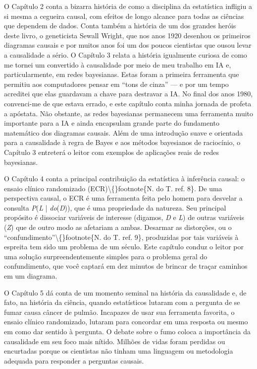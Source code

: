 \documentclass[11pt,a5paper,twoside]{book}
\begin{document}
O Capítulo 2 conta a bizarra história de como a disciplina da estatística infligiu a si mesma a cegueira causal, com efeitos de longo alcance para todas as ciências que dependem de dados. Conta também a história de um dos grandes heróis deste livro, o geneticista Sewall Wright, que nos anos 1920 desenhou os primeiros diagramas causais e por muitos anos foi um dos poucos cientistas que ousou levar a causalidade a sério. O Capítulo 3 relata a história igualmente curiosa de como me tornei um convertido à causalidade por meio de meu trabalho em IA e, particularmente, em redes bayesianas. Estas foram a primeira ferramenta que permitiu aos computadores pensar em “tons de cinza” — e por um tempo acreditei que elas guardavam a chave para destravar a IA. No final dos anos 1980, convenci-me de que estava errado, e este capítulo conta minha jornada de profeta a apóstata. Não obstante, as redes bayesianas permanecem uma ferramenta muito importante para a IA e ainda encapsulam grande parte do fundamento matemático dos diagramas causais. Além de uma introdução suave e orientada para a causalidade à regra de Bayes e aos métodos bayesianos de raciocínio, o Capítulo 3 entreterá o leitor com exemplos de aplicações reais de redes bayesianas.

O Capítulo 4 conta a principal contribuição da estatística à inferência causal: o ensaio clínico randomizado (ECR)\textbackslash\{\}footnote\{N. do T. ref. 8\}. De uma perspectiva causal, o ECR é uma ferramenta feita pelo homem para desvelar a consulta \textit{P}(\textit{L} | \textit{do}(\textit{D})), que é uma propriedade da natureza. Seu principal propósito é dissociar variáveis de interesse (digamos, \textit{D} e \textit{L}) de outras variáveis (\textit{Z}) que de outro modo as afetariam a ambas. Desarmar as distorções, ou o “confundimento”\textbackslash\{\}footnote\{N. do T. ref. 9\}, produzidas por tais variáveis à espreita tem sido um problema de um século. Este capítulo conduz o leitor por uma solução surpreendentemente simples para o problema geral do confundimento, que você captará em dez minutos de brincar de traçar caminhos em um diagrama.

O Capítulo 5 dá conta de um momento seminal na história da causalidade e, de fato, na história da ciência, quando estatísticos lutaram com a pergunta de se fumar causa câncer de pulmão. Incapazes de usar sua ferramenta favorita, o ensaio clínico randomizado, lutaram para concordar em uma resposta ou mesmo em como dar sentido à pergunta. O debate sobre o fumo coloca a importância da causalidade em seu foco mais nítido. Milhões de vidas foram perdidas ou encurtadas porque os cientistas não tinham uma linguagem ou metodologia adequada para responder a perguntas causais.
\end{document}
